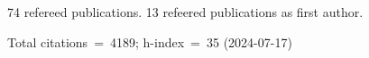 74 refereed publications. 13 refeered publications as first author.

Total citations~=~4189; h-index~=~35 (2024-07-17)